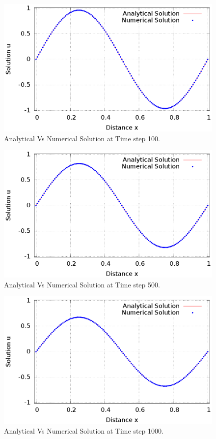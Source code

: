 \documentclass[12pt]{article}
\begin{document}
	\begin{figure}[H]
		\centering
		\includegraphics[scale=1]{"Gnuplot/NSvsAS_100_plot_for_128_grid_points.eps"}
		\caption{Analytical Vs Numerical Solution at Time step 100.}	
	\end{figure}
	
	\newpage
	
	\begin{figure}[H]
		\centering
		\includegraphics[scale=1]{"Gnuplot/NSvsAS_500_plot_for_128_grid_points.eps"}
		\caption{Analytical Vs Numerical Solution at Time step 500.}	
	\end{figure}

	\begin{figure}[H]
		\centering
		\includegraphics[scale=1]{"Gnuplot/NSvsAS_1000_plot_for_128_grid_points.eps"}
		\caption{Analytical Vs Numerical Solution at Time step 1000.}	
	\end{figure}
	
\end{document}

